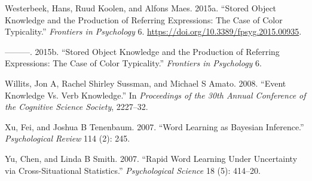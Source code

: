 \documentclass{ucetd}
\newlength{\cslhangindent}
\newenvironment{cslreferences}%
{\setlength{\parindent}{0pt}%
\everypar{\setlength{\hangindent}{\cslhangindent}}\ignorespaces}%
{\par}
\begin{document}
\begin{cslreferences}
\leavevmode\hypertarget{ref-westerbeek_2015}{}%
Westerbeek, Hans, Ruud Koolen, and Alfons Maes. 2015a. ``Stored Object
Knowledge and the Production of Referring Expressions: The Case of Color
Typicality.'' \emph{Frontiers in Psychology} 6.
\url{https://doi.org/10.3389/fpsyg.2015.00935}.

\leavevmode\hypertarget{ref-westerbeek2015}{}%
---------. 2015b. ``Stored Object Knowledge and the Production of
Referring Expressions: The Case of Color Typicality.'' \emph{Frontiers
in Psychology} 6.

\leavevmode\hypertarget{ref-willits2008}{}%
Willits, Jon A, Rachel Shirley Sussman, and Michael S Amato. 2008.
``Event Knowledge Vs. Verb Knowledge.'' In \emph{Proceedings of the 30th
Annual Conference of the Cognitive Science Society}, 2227--32.

\leavevmode\hypertarget{ref-xu2007}{}%
Xu, Fei, and Joshua B Tenenbaum. 2007. ``Word Learning as Bayesian
Inference.'' \emph{Psychological Review} 114 (2): 245.

\leavevmode\hypertarget{ref-yu2007}{}%
Yu, Chen, and Linda B Smith. 2007. ``Rapid Word Learning Under
Uncertainty via Cross-Situational Statistics.'' \emph{Psychological
Science} 18 (5): 414--20.
\end{cslreferences}


\makebibliography

%
%
\end{document}
